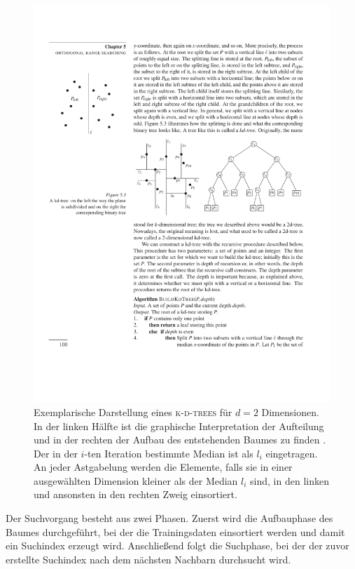\begin{figure}[h]
    \centering
    \includegraphics[width = 0.9 \textwidth]{figures/illustrations/kdtree.pdf}
    \caption{Exemplarische Darstellung eines \textsc{k-d-trees} für $d=2$ Dimensionen. In der linken Hälfte ist die graphische Interpretation der Aufteilung und in der rechten der Aufbau des entstehenden Baumes zu finden \cite{de2000computational}. Der in der $i$-ten Iteration bestimmte Median ist als $l_i$ eingetragen. An jeder Astgabelung werden die Elemente, falls sie in einer ausgewählten Dimension kleiner als der Median $l_i$ sind, in den linken und ansonsten in den rechten Zweig einsortiert.}
    \label{fig:kdtree}
\end{figure}


Der Suchvorgang besteht aus zwei Phasen. Zuerst wird die Aufbauphase des Baumes durchgeführt, bei der die Trainingsdaten einsortiert werden und damit ein Suchindex erzeugt wird. Anschließend folgt die Suchphase, bei der der zuvor erstellte Suchindex nach dem nächsten Nachbarn durchsucht wird.\\

